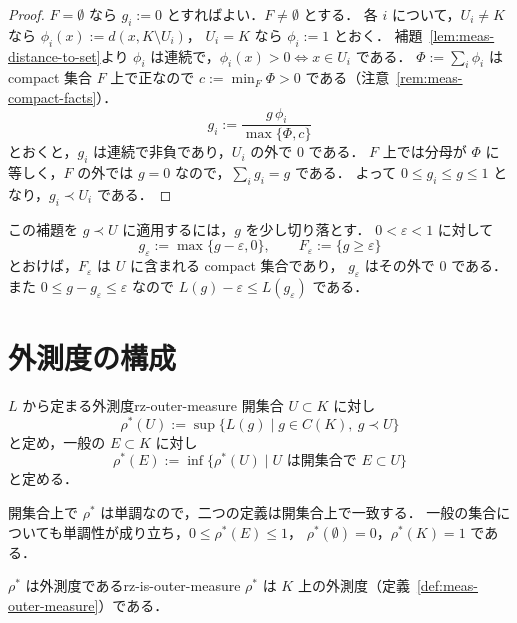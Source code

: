 \begin{proof}
  $F=\emptyset$ なら $g_i:=0$ とすればよい．$F\neq\emptyset$ とする．
  各 $i$ について，$U_i\neq K$ なら $\phi_i(x):=d(x,K\setminus U_i)$，
  $U_i=K$ なら $\phi_i:=1$ とおく．
  補題~\ref{lem:meas-distance-to-set}より $\phi_i$ は連続で，$\phi_i(x)>0\iff x\in U_i$ である．
  $\Phi:=\sum_i\phi_i$ は compact 集合 $F$ 上で正なので
  $c:=\min_F\Phi>0$ である（注意~\ref{rem:meas-compact-facts}）．
  \[
    g_i:=\frac{g\,\phi_i}{\max\{\Phi,c\}}
  \]
  とおくと，$g_i$ は連続で非負であり，$U_i$ の外で $0$ である．
  $F$ 上では分母が $\Phi$ に等しく，$F$ の外では $g=0$ なので，$\sum_ig_i=g$ である．
  よって $0\leq g_i\leq g\leq1$ となり，$g_i\prec U_i$ である．
\end{proof}

この補題を $g\prec U$ に適用するには，$g$ を少し切り落とす．
$0<\varepsilon<1$ に対して
\[
  g_\varepsilon:=\max\{g-\varepsilon,0\},\qquad F_\varepsilon:=\{g\geq\varepsilon\}
\]
とおけば，$F_\varepsilon$ は $U$ に含まれる compact 集合であり，
$g_\varepsilon$ はその外で $0$ である．また $0\leq g-g_\varepsilon\leq\varepsilon$ なので
$L(g)-\varepsilon\leq L(g_\varepsilon)$ である．

\section{外測度の構成}

\begin{definition}{$L$ から定まる外測度}{rz-outer-measure}
  開集合 $U\subset K$ に対し
  \[
    \rho^*(U):=\sup\{L(g)\mid g\in C(K),\ g\prec U\}
  \]
  と定め，一般の $E\subset K$ に対し
  \[
    \rho^*(E):=\inf\{\rho^*(U)\mid U\text{ は開集合で }E\subset U\}
  \]
  と定める．
\end{definition}

開集合上で $\rho^*$ は単調なので，二つの定義は開集合上で一致する．
一般の集合についても単調性が成り立ち，$0\leq\rho^*(E)\leq1$，
$\rho^*(\emptyset)=0$，$\rho^*(K)=1$ である．

\begin{lemma}{$\rho^*$ は外測度である}{rz-is-outer-measure}
  $\rho^*$ は $K$ 上の外測度（定義~\ref{def:meas-outer-measure}）である．
\end{lemma}

